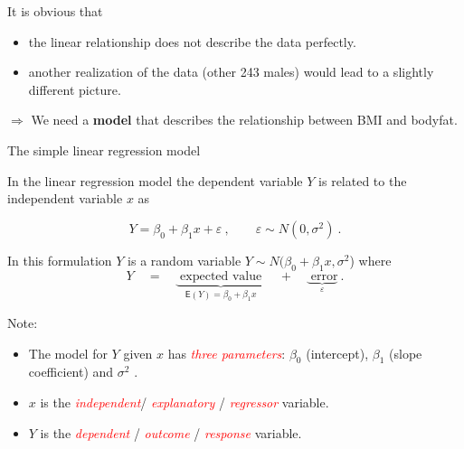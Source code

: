 \documentclass[10pt,ignorenonframetext,]{beamer}
\providecommand{\tightlist}{%
  \setlength{\itemsep}{0pt}\setlength{\parskip}{0pt}}
\begin{document}
\begin{frame}

It is obvious that

\begin{itemize}
\tightlist
\item
  the linear relationship does not describe the data perfectly.
\item
  another realization of the data (other 243 males) would lead to a
  slightly different picture.
\end{itemize}

\vspace{4mm}

\(\Rightarrow\) We need a \textbf{model} that describes the relationship
between BMI and bodyfat.

\end{frame}

\begin{frame}

\begin{block}{The simple linear regression model}

\vspace{3mm}

In the linear regression model the dependent variable \(Y\) is related
to the independent variable \(x\) as

\[Y = \beta_0 + \beta_1 x + \varepsilon \ , \qquad \varepsilon \sim N(0,\sigma^2) \ .\]
\vspace{2mm}

In this formulation \(Y\) is a random variable
\(Y \sim N(\beta_0 + \beta_1 x, \sigma^2\)) where
\[Y \quad= \quad \underbrace{\text{ expected value }}_{\mathsf{E}(Y) = \beta_0 + \beta_1 x} \quad + \quad \underbrace{\text{ error}}_{\varepsilon}  \ .\]

Note:

\begin{itemize}
\tightlist
\item
  The model for \(Y\) given \(x\) has
  \emph{\textcolor{red}{three parameters}}: \(\beta_0\) (intercept),
  \(\beta_1\) (slope coefficient) and \(\sigma^2\) .
\item
  \(x\) is the \emph{\textcolor{red}{independent}}/
  \emph{\textcolor{red}{explanatory}} /
  \emph{\textcolor{red}{regressor}} variable.
\item
  \(Y\) is the \emph{\textcolor{red}{dependent}} /
  \emph{\textcolor{red}{outcome}} / \emph{\textcolor{red}{response}}
  variable.
\end{itemize}

\end{block}

\end{frame}
\end{document}
